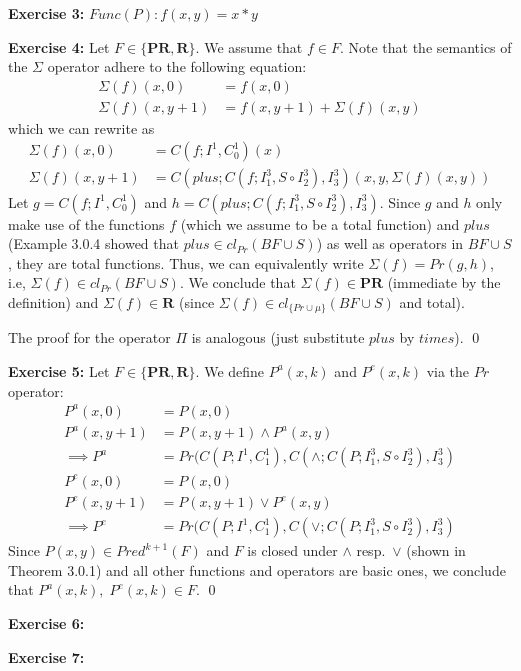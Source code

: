\documentclass [11pt]{article}
\newcommand{\PR}{\textbf{PR}}
\newcommand{\R}{\textbf{R}}
\begin{document}
\bigskip
\noindent
\textbf{Exercise 3:}
$Func(P): f(x,y) = x*y$

\bigskip
\noindent
\textbf{Exercise 4:}
Let $F \in \{\PR, \R\}$. 
We assume that $f \in F$.
Note that the semantics of the $\Sigma$ operator adhere to the following equation:
\begin{align*}
\Sigma(f)(x,0) &= f(x,0) \\
\Sigma(f)(x, y+1) &= f(x,y+1) + \Sigma(f)(x,y)
\end{align*}
which we can rewrite as
\begin{align*}
\Sigma(f)(x,0) &= C(f; I^1, C^1_0)(x) \\
\Sigma(f)(x, y+1) &= C(plus; C(f; I^3_1, S \circ I^3_2), I^3_3) (x,y, \Sigma(f)(x,y))
\end{align*}
Let $g = C(f; I^1, C^1_0)$ and $h = C(plus; C(f; I^3_1, S \circ I^3_2), I^3_3)$. 
Since $g$ and $h$ only make use of the functions $f$ (which we assume to be a total function) and $plus$ (Example 3.0.4 showed that $plus \in cl_{Pr}(BF\cup S)$) as well as operators in $BF \cup S$, they are total functions.
Thus, we can equivalently write $\Sigma(f) = Pr(g, h)$, i.e, $\Sigma(f) \in cl_{Pr}(BF \cup S)$. 
We conclude that $\Sigma(f) \in \PR$ (immediate by the definition) and $\Sigma(f) \in \R$ (since $\Sigma(f) \in cl_{\{Pr \cup \mu \}}(BF \cup S)$ and total). 

\medskip
\noindent
The proof for the operator $\Pi$ is analogous (just substitute $plus$ by $times$).
\qed


\bigskip
\noindent
\textbf{Exercise 5:}
Let $F \in \{\PR, \R\}$. 
We define $P^a(x,k)$ and $P^e(x,k)$ via the $Pr$ operator:
\begin{align*}
P^a(x, 0) &= P(x,0) \\
P^a(x, y+1) &= P(x,y+1) \land P^a(x,y) \\
\implies P^a &= Pr(C(P; I^1, C^1_1),  C(\land; C(P; I^3_1, S \circ I^3_2), I^3_3) 
\end{align*}
\begin{align*}
P^e(x, 0) &= P(x,0) \\
P^e(x, y+1) &= P(x,y+1) \lor P^e(x,y) \\
\implies P^e &= Pr(C(P; I^1, C^1_1),  C(\lor; C(P; I^3_1, S \circ I^3_2), I^3_3) 
\end{align*}
Since $P(x,y) \in Pred^{k+1}(F)$ and $F$ is closed under $\land$ resp.~$\lor$ (shown in Theorem 3.0.1) and all other functions and operators are basic ones, we conclude that $P^a(x,k),\; P^e(x,k) \in F$.
\qed

\bigskip
\noindent
\textbf{Exercise 6:}

\bigskip
\noindent
\textbf{Exercise 7:}

 
\end{document}
